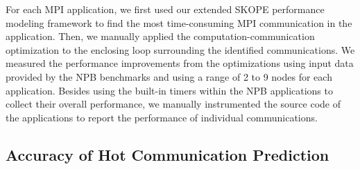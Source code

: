 For each MPI application, we first used our extended SKOPE performance modeling framework to find the most time-consuming MPI communication in the application.
Then, we manually applied the computation-communication optimization to the enclosing loop surrounding the identified communications.
We measured the performance improvements from the optimizations using input data
 provided by the NPB benchmarks and using a range of 2 to 9 nodes for each application.
Besides using the built-in timers within the NPB applications to collect their overall performance,
  we manually instrumented the source code of the applications to report the performance of  individual communications.



\subsection{Accuracy of Hot Communication Prediction}

